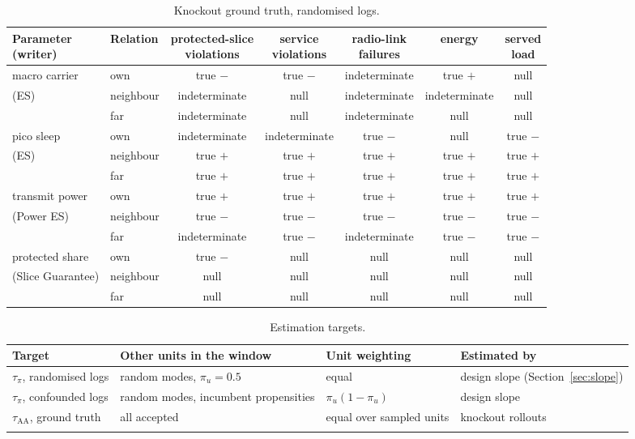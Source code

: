 \begin{table}[tbp]
\caption{Knockout ground truth, randomised logs.}
\label{tab:system_hypotheses}
\setlength{\tabcolsep}{3pt}
\begin{tabular}{@{}l l c c c c c@{}}
\toprule
\shortstack[l]{Parameter\\(writer)} & Relation & \shortstack{protected-slice\\violations} & \shortstack{service\\violations} & \shortstack{radio-link\\failures} & energy & \shortstack{served\\load} \\
\midrule
macro carrier & own & true $-$ & true $-$ & indeterminate & true $+$ & null \\
(ES) & neighbour & indeterminate & null & indeterminate & indeterminate & null \\
 & far & indeterminate & null & indeterminate & null & null \\
\midrule
pico sleep & own & indeterminate & indeterminate & true $-$ & null & true $-$ \\
(ES) & neighbour & true $+$ & true $+$ & true $+$ & true $+$ & true $+$ \\
 & far & true $+$ & true $+$ & true $+$ & true $+$ & true $+$ \\
\midrule
transmit power & own & true $+$ & true $+$ & true $+$ & true $+$ & true $+$ \\
(Power ES) & neighbour & true $-$ & true $-$ & true $-$ & true $-$ & true $-$ \\
 & far & indeterminate & true $-$ & indeterminate & true $-$ & true $-$ \\
\midrule
protected share & own & true $-$ & null & null & null & null \\
(Slice Guarantee) & neighbour & null & null & null & null & null \\
 & far & null & null & null & null & null \\
\bottomrule
\end{tabular}
\end{table}

\begin{table}[tbp]
\caption{Estimation targets.}
\label{tab:estimands}
\footnotesize
\setlength{\tabcolsep}{4pt}
\begin{tabular*}{\textwidth}{@{\extracolsep{\fill}}>{\raggedright}p{}>{\raggedright}p{}>{\raggedright}p{}>{\raggedright\arraybackslash}p{}@{}}
\toprule
Target & Other units in the window & Unit weighting & Estimated by \\
\midrule
$\tau_{\pi}$, randomised logs & random modes, $\pi_u = 0.5$ & equal & design slope (Section~\ref{sec:slope}) \\
$\tau_{\pi}$, confounded logs & random modes, incumbent propensities & $\pi_u(1 - \pi_u)$ & design slope \\
$\tau_{\mathrm{AA}}$, ground truth & all accepted & equal over sampled units & knockout rollouts \\
\botrule
\end{tabular*}
\end{table}

